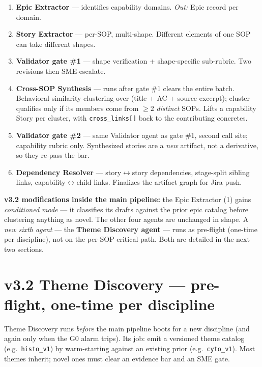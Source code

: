 \documentclass[10pt,letterpaper]{article}
\begin{document}
\begin{enumerate}
  \item \textbf{Epic Extractor} --- identifies capability domains. \emph{Out:} Epic record per domain.
  \item \textbf{Story Extractor} --- per-SOP, multi-shape. Different elements of one SOP can take different shapes.
  \item \textbf{Validator gate \#1} --- shape verification + shape-specific sub-rubric. Two revisions then SME-escalate.
  \item \textbf{Cross-SOP Synthesis} --- runs after gate \#1 clears the entire batch. Behavioral-similarity clustering over (title + AC + source excerpt); cluster qualifies only if its members come from $\geq 2$ \emph{distinct} SOPs. Lifts a capability Story per cluster, with \texttt{cross\_links[]} back to the contributing concretes.
  \item \textbf{Validator gate \#2} --- same Validator agent as gate \#1, second call site; capability rubric only. Synthesized stories are a \emph{new} artifact, not a derivative, so they re-pass the bar.
  \item \textbf{Dependency Resolver} --- story$\leftrightarrow$story dependencies, stage-split sibling links, capability$\leftrightarrow$child links. Finalizes the artifact graph for Jira push.
\end{enumerate}

\textbf{v3.2 modifications inside the main pipeline:} the Epic Extractor (1) gains \emph{conditioned mode} --- it classifies its drafts against the prior epic catalog before clustering anything as novel. The other four agents are unchanged in shape. A \emph{new sixth agent} --- the \textbf{Theme Discovery agent} --- runs as pre-flight (one-time per discipline), not on the per-SOP critical path. Both are detailed in the next two sections.

\section{v3.2 Theme Discovery --- pre-flight, one-time per discipline}

Theme Discovery runs \emph{before} the main pipeline boots for a new discipline (and again only when the G0 alarm trips). Its job: emit a versioned theme catalog (e.g.\ \texttt{histo\_v1}) by warm-starting against an existing prior (e.g.\ \texttt{cyto\_v1}). Most themes inherit; novel ones must clear an evidence bar and an SME gate.
\end{document}
